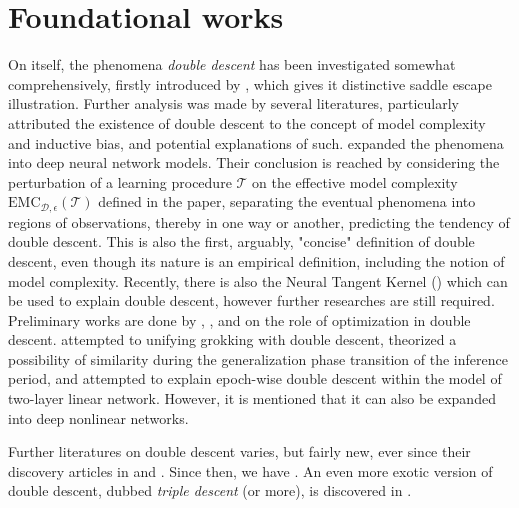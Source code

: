 \documentclass[
  journal=largetwo,
  year=2025,
  volume=37,
]{cup-journal}
\begin{document}
\section{Foundational works}

On itself, the phenomena \textit{double descent} has been investigated somewhat comprehensively, firstly introduced by \cite{belkin_reconciling_2019}, which gives it distinctive saddle escape illustration. Further analysis was made by several literatures, particularly attributed the existence of double descent to the concept of model complexity and inductive bias, and potential explanations of such. \cite{nakkiran_deep_2019} expanded the phenomena into deep neural network models. Their conclusion is reached by considering the perturbation of a learning procedure $\mathcal{T}$ on the effective model complexity $\mathrm{EMC}_{\mathcal{D},\epsilon}(\mathcal{T})$ defined in the paper, separating the eventual phenomena into regions of observations, thereby in one way or another, predicting the tendency of double descent. This is also the first, arguably, "concise" definition of double descent, even though its nature is an empirical definition, including the notion of model complexity. Recently, there is also the Neural Tangent Kernel (\cite{Jacot:2018:NTK}) which can be used to explain double descent, however further researches are still required. Preliminary works are done by \cite{lafon_understanding_2024}, \cite{schaeffer_double_2023}, and \cite{liu2023understandingroleoptimizationdouble} on the role of optimization in double descent. \cite{davies_unifying_2023} attempted to unifying grokking with double descent, theorized a possibility of similarity during the generalization phase transition of the inference period, and \cite{olmin2024understandingepochwisedoubledescent} attempted to explain epoch-wise double descent within the model of two-layer linear network. However, it is mentioned that it can also be expanded into deep nonlinear networks. 

Further literatures on double descent varies, but fairly new, ever since their discovery articles in \cite{belkin_reconciling_2019} and \cite{nakkiran_deep_2019}. Since then, we have \cite{shi2024homophilymodulatesdoubledescent,schaeffer_double_2023,quetu_can_2023,lafon_understanding_2024,neal2019biasvariancetradeofftextbooksneed,davies_unifying_2023,quetu_can_2023-1,liu2023understandingroleoptimizationdouble,mei2020generalizationerrorrandomfeatures,mei2019generalization,adlam2020understandingdoubledescentrequires,transtrum2025egaddoubledescentexplained,liu2021kernelregressionhighdimensions,allerbo2025changingkerneltrainingleads,pezeshki2021multiscalefeaturelearningdynamics,brellmann2024on,nakkiran2019moredata,mei2019randomfeatures,heckel2020early,nakkiran2020regularization,Belkin_2020,Yang_2024,spiess2023doublesingledescentcausal,nakkiran2021optimalregularizationmitigatedouble,zhang2024manipulatingsparsedoubledescent,cherkassky2024understand,nakkiran2019datahurtlinearregression}. An even more exotic version of double descent, dubbed \textit{triple descent} (or more), is discovered in \cite{d_ascoli_triple_2020}. 
\end{document}
